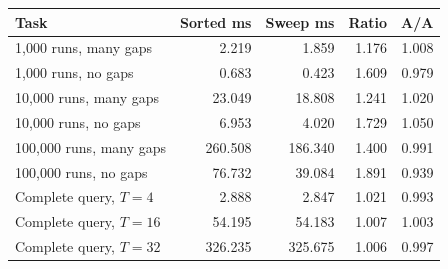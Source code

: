 \begin{center}
\small
\begin{tabular}{@{}lrrrr@{}}
\toprule
Task & Sorted ms & Sweep ms & Ratio & A/A \\
\midrule
1,000 runs, many gaps & 2.219 & 1.859 & 1.176 & 1.008 \\
1,000 runs, no gaps & 0.683 & 0.423 & 1.609 & 0.979 \\
10,000 runs, many gaps & 23.049 & 18.808 & 1.241 & 1.020 \\
10,000 runs, no gaps & 6.953 & 4.020 & 1.729 & 1.050 \\
100,000 runs, many gaps & 260.508 & 186.340 & 1.400 & 0.991 \\
100,000 runs, no gaps & 76.732 & 39.084 & 1.891 & 0.939 \\
Complete query, $T=4$ & 2.888 & 2.847 & 1.021 & 0.993 \\
Complete query, $T=16$ & 54.195 & 54.183 & 1.007 & 1.003 \\
Complete query, $T=32$ & 326.235 & 325.675 & 1.006 & 0.997 \\
\bottomrule
\end{tabular}
\end{center}
